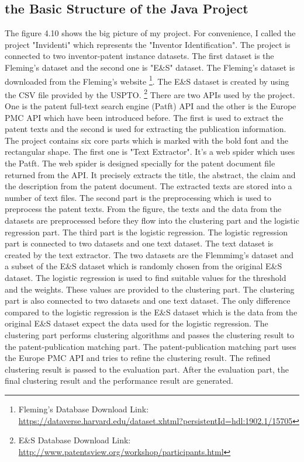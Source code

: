 \subsection{the Basic Structure of the Java Project}
The figure 4.10 shows the big picture of my project. For convenience, I called the project "Invidenti" which represents the "Inventor Identification". The project is connected to two inventor-patent instance datasets. The first dataset is the Fleming's dataset and the second one is "E\&S" dataset. The Fleming's dataset is downloaded from the Fleming's website \footnote{Fleming's Database Download Link: \url{https://dataverse.harvard.edu/dataset.xhtml?persistentId=hdl:1902.1/15705}}. The E\&S dataset is created by using the CSV file provided by the USPTO. \footnote{E\&S Database Download Link: \url {http://www.patentsview.org/workshop/participants.html} } There are two APIs used by the project. One is the patent full-text search engine (Patft) API and the other is the Europe PMC API which have been introduced before. The first is used to extract the patent texts and the second is used for extracting the publication information. The project contains six core parts which is marked with the bold font and the rectangular shape. The first one is "Text Extractor". It's a web spider which uses the Patft. The web spider is designed specially for the patent document file returned from the API. It precisely extracts the title, the abstract, the claim and the description from the patent document. The extracted texts are stored into a number of text files. The second part is the preprocessing which is used to preprocess the patent texts.  From the figure, the texts and the data from the datasets are preprocessed before they flow into the clustering part and the logistic regression part. The third part is the logistic regression. The logistic regression part  is connected to two datasets and one text dataset. The text dataset is created by the text extractor. The two datasets are the Flemmimg's dataset and a subset of the E\&S dataset which is randomly chosen from the original E\&S dataset. The logistic regression is used to find suitable values for the threshold and the weights. These values are provided to the clustering part. The clustering part is also connected to two datasets and one text dataset. The only difference compared to the logistic regression is the E\&S dataset which is the data from the original E\&S dataset expect the data used for the logistic regression. The clustering part performs clustering algorithms and passes the clustering result to the patent-publication matching part. The patent-publication matching part uses the Europe PMC API and tries to refine the clustering result. The refined clustering result is passed to the evaluation part. After the evaluation part, the final clustering result and the performance result are generated.   

